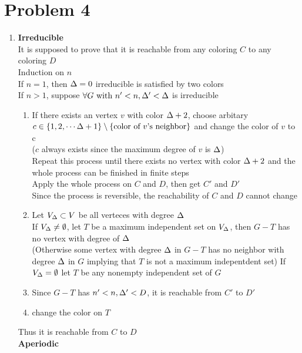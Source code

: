 \documentclass[12pt]{article}
\begin{document}
\section*{Problem 4}
\begin{enumerate}
\item
\textbf{Irreducible}\\

It is supposed to prove that it is reachable from any coloring $C$ to any coloring $D$\\
Induction on $n$\\

If $n=1$, then $\Delta=0$ irreducible is satisfied by two colors\\
If $n>1$, suppose $\forall G\text{ with }n'<n, \Delta'<\Delta$ is irreducible
\begin{enumerate}
\item
If there exists an vertex $v$ with color $\Delta+2$, choose arbitary $c\in\{1,2,\cdots\Delta+1\}\setminus\{\text{color of $v$'s neighbor}\}$ and change the color of $v$ to c\\
($c$ always exists since the maximum degree of $v$ is $\Delta$)\\

Repeat this process until there exists no vertex with color $\Delta+2$ and the whole process can be finished in finite steps\\
Apply the whole process on $C$ and $D$, then get $C'$ and $D'$\\
Since the process is reversible, the reachability of $C$ and $D$ cannot change\\
\item
Let $V_\Delta\subset V$ be all verteces with degree $\Delta$\\
If $V_\Delta\neq \emptyset$, let $T$ be a maximum independent set on $V_\Delta$, then $G-T$ has no vertex with degree of $\Delta$\\
(Otherwise some vertex with degree $\Delta$ in $G-T$ has no neighbor with degree $\Delta$ in $G$ implying that $T$ is not a maximum indepentdent set)
If $V_\Delta=\emptyset$ let $T$ be any nonempty independent set of $G$\\
\item
Since $G-T$ has $n'<n, \Delta'<D$, it is reachable from $C'$ to $D'$\\
\item
change the color on $T$
\end{enumerate}
Thus it is reachable from $C$ to $D$\\

\textbf{Aperiodic}\\


\end{enumerate}
\end{document}
